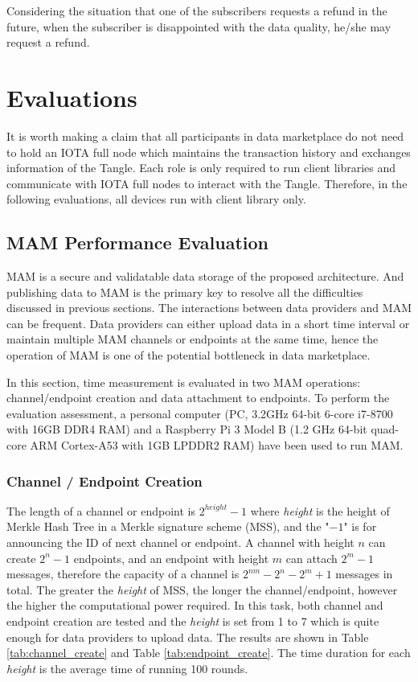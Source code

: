 \documentclass[conference]{IEEEtran}
\begin{document}
Considering the situation that one of the subscribers requests a refund in the future, when the subscriber is disappointed with the data quality, he/she may request a refund.

\section{Evaluations}
It is worth making a claim that all participants in data marketplace do not need to hold an IOTA full node which maintains the transaction history and exchanges information of the Tangle. Each role is only required to run client libraries and communicate with IOTA full nodes to interact with the Tangle. Therefore, in the following evaluations, all devices run with client library only.

\subsection{MAM Performance Evaluation}
MAM is a secure and validatable data storage of the proposed architecture. And publishing data to MAM is the primary key to resolve all the difficulties discussed in previous sections. The interactions between data providers and MAM can be frequent. Data providers can either upload data in a short time interval or maintain multiple MAM channels or endpoints at the same time, hence the operation of MAM is one of the potential bottleneck in data marketplace.

In this section, time measurement is evaluated in two MAM operations: channel/endpoint creation and data attachment to endpoints. To perform the evaluation assessment, a personal computer (PC, 3.2GHz 64-bit 6-core i7-8700 with 16GB DDR4 RAM) and a Raspberry Pi 3 Model B (1.2 GHz 64-bit quad-core ARM Cortex-A53 with 1GB LPDDR2 RAM) have been used to run MAM. 

\subsubsection{Channel / Endpoint Creation}
The length of a channel or endpoint is $2^{height}-1$ where \textit{height} is the height of Merkle Hash Tree in a Merkle signature scheme (MSS), and the "$-1$" is for announcing the ID of next channel or endpoint. A channel with height $n$ can create $2^n-1$ endpoints, and an endpoint with height $m$ can attach $2^m-1$ messages, therefore the capacity of a channel is $2^{nm}-2^n-2^m+1$ messages in total. The greater the \textit{height} of MSS, the longer the channel/endpoint, however the higher the computational power required. In this task, both channel and endpoint creation are tested and the \textit{height} is set from 1 to 7 which is quite enough for data providers to upload data. The results are shown in Table \ref{tab:channel_create} and Table \ref{tab:endpoint_create}. The time duration for each \textit{height} is the average time of running 100 rounds.
\end{document}
